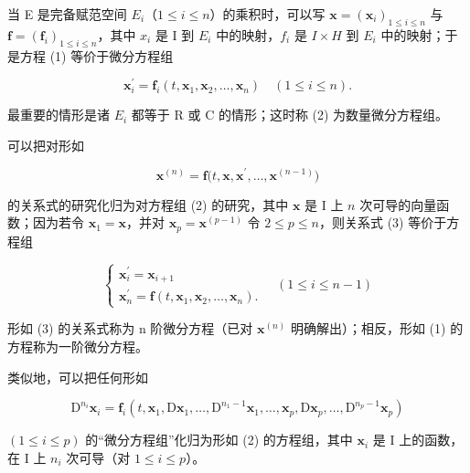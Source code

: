 当 E 是完备赋范空间 \(E_{i}\)（\(1 \leqslant i \leqslant n\)）的乘积时，可以写 \(\mathbf{x} = (\mathbf{x}_{i})_{1 \leqslant i \leqslant n}\) 与 \(\mathbf{f} = (\mathbf{f}_{i})_{1 \leqslant i \leqslant n}\)，其中 \(x_{i}\) 是 I 到 \(E_{i}\) 中的映射，\(f_{i}\) 是 \(I \times H\) 到 \(E_{i}\) 中的映射；于是方程 (1) 等价于微分方程组

\[
\mathbf {x} _ {i} ^ {\prime} = \mathbf {f} _ {i} (t, \mathbf {x} _ {1}, \mathbf {x} _ {2}, \dots , \mathbf {x} _ {n}) \quad (1 \leqslant i \leqslant n).\tag{2}
\]

最重要的情形是诸 \(E_{i}\) 都等于 R 或 C 的情形；这时称 (2) 为数量微分方程组。

可以把对形如

\[
\mathbf {x} ^ {(n)} = \mathbf {f} \big (t, \mathbf {x}, \mathbf {x} ^ {\prime}, \dots , \mathbf {x} ^ {(n - 1)} \big)\tag{3}
\]

的关系式的研究化归为对方程组 (2) 的研究，其中 \(\mathbf{x}\) 是 I 上 \(n\) 次可导的向量函数；因为若令 \(\mathbf{x}_1 = \mathbf{x}\)，并对 \(\mathbf{x}_p = \mathbf{x}^{(p - 1)}\) 令 \(2 \leqslant p \leqslant n\)，则关系式 (3) 等价于方程组

\[
\left\{ \begin{array}{l} \mathbf {x} _ {i} ^ {\prime} = \mathbf {x} _ {i + 1} \\ \mathbf {x} _ {n} ^ {\prime} = \mathbf {f} (t, \mathbf {x} _ {1}, \mathbf {x} _ {2}, \ldots , \mathbf {x} _ {n}). \end{array} \right. \quad (1 \leqslant i \leqslant n - 1)\tag{4}
\]

形如 (3) 的关系式称为 n 阶微分方程（已对 \(\mathbf{x}^{(n)}\) 明确解出）；相反，形如 (1) 的方程称为一阶微分方程。

类似地，可以把任何形如

\[
\mathrm{D} ^ {n _ {i}} \mathbf {x} _ {i} = \mathbf {f} _ {i} (t, \mathbf {x} _ {1}, \mathrm{D} \mathbf {x} _ {1}, \dots , \mathrm{D} ^ {n _ {1} - 1} \mathbf {x} _ {1}, \dots , \mathbf {x} _ {p}, \mathrm{D} \mathbf {x} _ {p}, \dots , \mathrm{D} ^ {n _ {p} - 1} \mathbf {x} _ {p})\tag{5}
\]

\((1 \leqslant i \leqslant p)\) 的“微分方程组”化归为形如 (2) 的方程组，其中 \(\mathbf{x}_i\) 是 I 上的函数，在 I 上 \(n_i\) 次可导（对 \(1 \leqslant i \leqslant p\)）。

